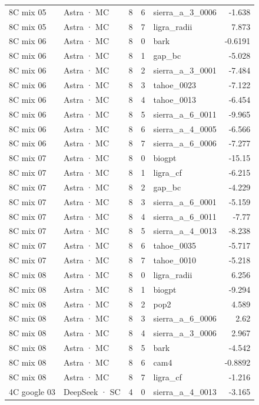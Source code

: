 \begin{tabular}{llrrlr}
8C mix 05 & Astra · MC & 8 & 6 & sierra\_a\_3\_0006 & -1.638 \\
8C mix 05 & Astra · MC & 8 & 7 & ligra\_radii & 7.873 \\
8C mix 06 & Astra · MC & 8 & 0 & bark & -0.6191 \\
8C mix 06 & Astra · MC & 8 & 1 & gap\_bc & -5.028 \\
8C mix 06 & Astra · MC & 8 & 2 & sierra\_a\_3\_0001 & -7.484 \\
8C mix 06 & Astra · MC & 8 & 3 & tahoe\_0023 & -7.122 \\
8C mix 06 & Astra · MC & 8 & 4 & tahoe\_0013 & -6.454 \\
8C mix 06 & Astra · MC & 8 & 5 & sierra\_a\_6\_0011 & -9.965 \\
8C mix 06 & Astra · MC & 8 & 6 & sierra\_a\_4\_0005 & -6.566 \\
8C mix 06 & Astra · MC & 8 & 7 & sierra\_a\_6\_0006 & -7.277 \\
8C mix 07 & Astra · MC & 8 & 0 & biogpt & -15.15 \\
8C mix 07 & Astra · MC & 8 & 1 & ligra\_cf & -6.215 \\
8C mix 07 & Astra · MC & 8 & 2 & gap\_bc & -4.229 \\
8C mix 07 & Astra · MC & 8 & 3 & sierra\_a\_6\_0001 & -5.159 \\
8C mix 07 & Astra · MC & 8 & 4 & sierra\_a\_6\_0011 & -7.77 \\
8C mix 07 & Astra · MC & 8 & 5 & sierra\_a\_4\_0013 & -8.238 \\
8C mix 07 & Astra · MC & 8 & 6 & tahoe\_0035 & -5.717 \\
8C mix 07 & Astra · MC & 8 & 7 & tahoe\_0010 & -5.218 \\
8C mix 08 & Astra · MC & 8 & 0 & ligra\_radii & 6.256 \\
8C mix 08 & Astra · MC & 8 & 1 & biogpt & -9.294 \\
8C mix 08 & Astra · MC & 8 & 2 & pop2 & 4.589 \\
8C mix 08 & Astra · MC & 8 & 3 & sierra\_a\_6\_0006 & 2.62 \\
8C mix 08 & Astra · MC & 8 & 4 & sierra\_a\_3\_0006 & 2.967 \\
8C mix 08 & Astra · MC & 8 & 5 & bark & -4.542 \\
8C mix 08 & Astra · MC & 8 & 6 & cam4 & -0.8892 \\
8C mix 08 & Astra · MC & 8 & 7 & ligra\_cf & -1.216 \\
4C google 03 & DeepSeek · SC & 4 & 0 & sierra\_a\_4\_0013 & -3.165 \\

\end{tabular}
